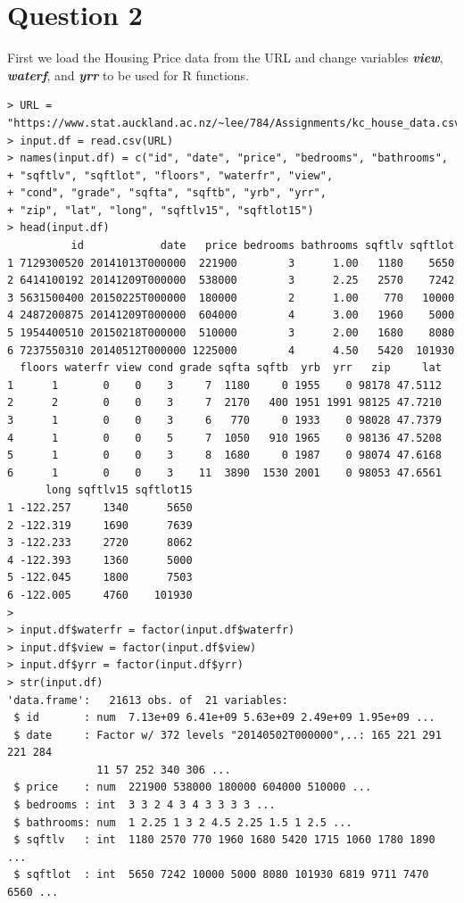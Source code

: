\documentclass{article}%
\begin{document}
\section{Question 2}
First we load the Housing Price data from the URL and change variables \emph{\textbf{view}}, \emph{\textbf{waterf}}, and \emph{\textbf{yrr}} to be used for R functions.
\begin{verbatim}
> URL = "https://www.stat.auckland.ac.nz/~lee/784/Assignments/kc_house_data.csv"
> input.df = read.csv(URL)
> names(input.df) = c("id", "date", "price", "bedrooms", "bathrooms",
+ "sqftlv", "sqftlot", "floors", "waterfr", "view",
+ "cond", "grade", "sqfta", "sqftb", "yrb", "yrr",
+ "zip", "lat", "long", "sqftlv15", "sqftlot15")
> head(input.df)
          id            date   price bedrooms bathrooms sqftlv sqftlot
1 7129300520 20141013T000000  221900        3      1.00   1180    5650
2 6414100192 20141209T000000  538000        3      2.25   2570    7242
3 5631500400 20150225T000000  180000        2      1.00    770   10000
4 2487200875 20141209T000000  604000        4      3.00   1960    5000
5 1954400510 20150218T000000  510000        3      2.00   1680    8080
6 7237550310 20140512T000000 1225000        4      4.50   5420  101930
  floors waterfr view cond grade sqfta sqftb  yrb  yrr   zip     lat
1      1       0    0    3     7  1180     0 1955    0 98178 47.5112
2      2       0    0    3     7  2170   400 1951 1991 98125 47.7210
3      1       0    0    3     6   770     0 1933    0 98028 47.7379
4      1       0    0    5     7  1050   910 1965    0 98136 47.5208
5      1       0    0    3     8  1680     0 1987    0 98074 47.6168
6      1       0    0    3    11  3890  1530 2001    0 98053 47.6561
      long sqftlv15 sqftlot15
1 -122.257     1340      5650
2 -122.319     1690      7639
3 -122.233     2720      8062
4 -122.393     1360      5000
5 -122.045     1800      7503
6 -122.005     4760    101930
> 
> input.df$waterfr = factor(input.df$waterfr)
> input.df$view = factor(input.df$view)
> input.df$yrr = factor(input.df$yrr)
> str(input.df)
'data.frame':   21613 obs. of  21 variables:
 $ id       : num  7.13e+09 6.41e+09 5.63e+09 2.49e+09 1.95e+09 ...
 $ date     : Factor w/ 372 levels "20140502T000000",..: 165 221 291 221 284 
              11 57 252 340 306 ...
 $ price    : num  221900 538000 180000 604000 510000 ...
 $ bedrooms : int  3 3 2 4 3 4 3 3 3 3 ...
 $ bathrooms: num  1 2.25 1 3 2 4.5 2.25 1.5 1 2.5 ...
 $ sqftlv   : int  1180 2570 770 1960 1680 5420 1715 1060 1780 1890 ...
 $ sqftlot  : int  5650 7242 10000 5000 8080 101930 6819 9711 7470 6560 ...

\end{verbatim}
\end{document}
